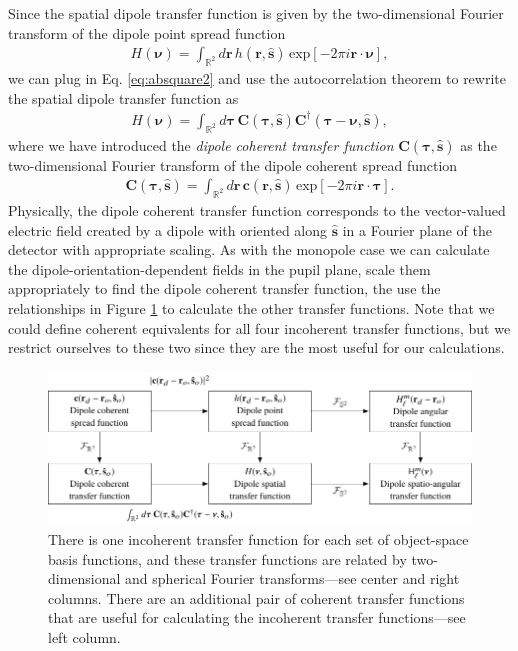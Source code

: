 \documentclass[]{osa-article}
\providecommand{\mb}[1]{\mathbf{#1}}
\providecommand{\mh}[1]{\mathbf{\hat{#1}}}
\providecommand{\mbb}[1]{\mathbb{#1}}
\providecommand{\bs}[1]{\boldsymbol{#1}}
\begin{document}
Since the spatial dipole transfer function is given by the two-dimensional
Fourier transform of the dipole point spread function
\begin{align}
  H(\bs{\nu}) = \int_{\mbb{R}^2}d\mb{r}\,h(\mb{r}, \mh{s})\,\text{exp}[-2\pi i\mb{r}\cdot\bs{\nu}],
\end{align}
we can plug in Eq. \ref{eq:absquare2} and use the autocorrelation theorem to
rewrite the spatial dipole transfer function as 
\begin{align}
  H(\bs{\nu}) = \int_{\mbb{R}^2}d\bs{\tau}\,\mb{C}(\bs{\tau}, \mh{s})\mb{C}^\dagger(\bs{\tau} - \bs{\nu}, \mh{s}), 
\end{align}
where we have introduced the \textit{dipole coherent transfer function}
$\mb{C}(\bs{\tau}, \mh{s})$ as the two-dimensional Fourier transform of the
dipole coherent spread function
\begin{align}
  \mb{C}(\bs{\tau}, \mh{s}) = \int_{\mbb{R}^2}d\mb{r}\, \mb{c}(\mb{r}, \mh{s})\,\text{exp}[-2\pi i\mb{r}\cdot\bs{\tau}].
\end{align}
Physically, the dipole coherent transfer function corresponds to the
vector-valued electric field created by a dipole with oriented along $\mh{s}$ in
a Fourier plane of the detector with appropriate scaling. As with the monopole
case we can calculate the dipole-orientation-dependent fields in the pupil
plane, scale them appropriately to find the dipole coherent transfer function,
the use the relationships in Figure \ref{fig:transfer-functions} to calculate
the other transfer functions. Note that we could define coherent equivalents
for all four incoherent transfer functions, but we restrict ourselves to these
two since they are the most useful for our calculations.

\begin{figure}
  \hspace{-2em}
  \includegraphics[scale=1.0]{../figures/transfer-functions/transfer-functions.pdf}
  \caption{There is one incoherent transfer function for each set of
    object-space basis functions, and these transfer functions are related by
    two-dimensional and spherical Fourier transforms---see center and right
    columns. There are an additional pair of coherent transfer functions that
    are useful for calculating the incoherent transfer functions---see left column.}
   \label{fig:transfer-functions}
 \end{figure}
    
\end{document}

